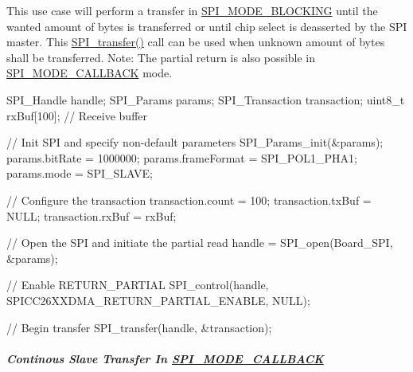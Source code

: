 This use case will perform a transfer in \hyperlink{_s_p_i_8h_ab9ea76c6529d6076eee5e1c4a5a92c6fa0dfb2358e008316426895e7237c398e8}{S\+P\+I\+\_\+\+M\+O\+D\+E\+\_\+\+B\+L\+O\+C\+K\+I\+N\+G} until the wanted amount of bytes is transferred or until chip select is deasserted by the S\+P\+I master. This \hyperlink{_s_p_i_8h_a989e17f96b54fcc3dc2cac5f8ac6bdb2}{S\+P\+I\+\_\+transfer()} call can be used when unknown amount of bytes shall be transferred. Note\+: The partial return is also possible in \hyperlink{_s_p_i_8h_ab9ea76c6529d6076eee5e1c4a5a92c6fa5631e69925c47a62a261c78ebbda39fb}{S\+P\+I\+\_\+\+M\+O\+D\+E\+\_\+\+C\+A\+L\+L\+B\+A\+C\+K} mode. 
\begin{DoxyCode}
SPI_Handle handle;
SPI_Params params;
SPI_Transaction transaction;
uint8\_t rxBuf[100];     \textcolor{comment}{// Receive buffer}

\textcolor{comment}{// Init SPI and specify non-default parameters}
SPI_Params_init(&params);
params.bitRate     = 1000000;
params.frameFormat = SPI_POL1_PHA1;
params.mode        = SPI_SLAVE;

\textcolor{comment}{// Configure the transaction}
transaction.count = 100;
transaction.txBuf = NULL;
transaction.rxBuf = rxBuf;

\textcolor{comment}{// Open the SPI and initiate the partial read}
handle = SPI_open(Board\_SPI, &params);

\textcolor{comment}{// Enable RETURN\_PARTIAL}
SPI_control(handle, SPICC26XXDMA_RETURN_PARTIAL_ENABLE, NULL);

\textcolor{comment}{// Begin transfer}
SPI_transfer(handle, &transaction);
\end{DoxyCode}


\subparagraph*{Continous Slave Transfer In \hyperlink{_s_p_i_8h_ab9ea76c6529d6076eee5e1c4a5a92c6fa5631e69925c47a62a261c78ebbda39fb}{S\+P\+I\+\_\+\+M\+O\+D\+E\+\_\+\+C\+A\+L\+L\+B\+A\+C\+K}\label{_s_p_i_c_c26_x_x_d_m_a_8h_USE_CASE_CST}%
\hypertarget{_s_p_i_c_c26_x_x_d_m_a_8h_USE_CASE_CST}{}%
}

